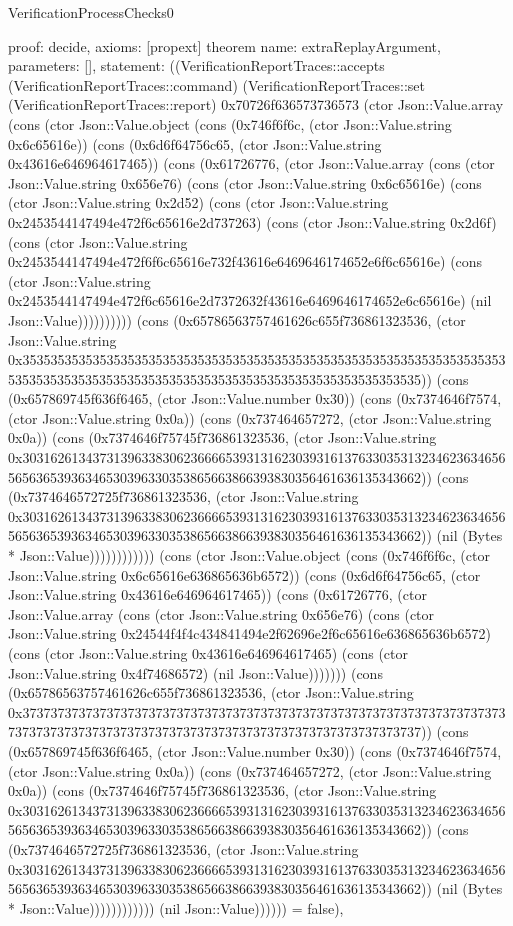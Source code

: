 \begin{lexlean}{VerificationProcessChecks0}
\begin{semanticmodule}
{  proof: decide{},
  axioms: [propext]
}
theorem{
  name: extraReplayArgument,
  parameters: [],
  statement: ((VerificationReportTraces::accepts (VerificationReportTraces::command) (VerificationReportTraces::set (VerificationReportTraces::report) 0x70726f636573736573 (ctor Json::Value.array (cons (ctor Json::Value.object (cons (0x746f6f6c, (ctor Json::Value.string 0x6c65616e)) (cons (0x6d6f64756c65, (ctor Json::Value.string 0x43616e646964617465)) (cons (0x61726776, (ctor Json::Value.array (cons (ctor Json::Value.string 0x656e76) (cons (ctor Json::Value.string 0x6c65616e) (cons (ctor Json::Value.string 0x2d52) (cons (ctor Json::Value.string 0x2453544147494e472f6c65616e2d737263) (cons (ctor Json::Value.string 0x2d6f) (cons (ctor Json::Value.string 0x2453544147494e472f6f6c65616e732f43616e6469646174652e6f6c65616e) (cons (ctor Json::Value.string 0x2453544147494e472f6c65616e2d7372632f43616e6469646174652e6c65616e) (nil Json::Value)))))))))) (cons (0x65786563757461626c655f736861323536, (ctor Json::Value.string 0x35353535353535353535353535353535353535353535353535353535353535353535353535353535353535353535353535353535353535353535353535353535)) (cons (0x657869745f636f6465, (ctor Json::Value.number 0x30)) (cons (0x7374646f7574, (ctor Json::Value.string 0x0a)) (cons (0x737464657272, (ctor Json::Value.string 0x0a)) (cons (0x7374646f75745f736861323536, (ctor Json::Value.string 0x30316261343731396338306236666539313162303931613763303531323462363465656563653936346530396330353865663866393830356461636135343662)) (cons (0x7374646572725f736861323536, (ctor Json::Value.string 0x30316261343731396338306236666539313162303931613763303531323462363465656563653936346530396330353865663866393830356461636135343662)) (nil (Bytes * Json::Value)))))))))))) (cons (ctor Json::Value.object (cons (0x746f6f6c, (ctor Json::Value.string 0x6c65616e636865636b6572)) (cons (0x6d6f64756c65, (ctor Json::Value.string 0x43616e646964617465)) (cons (0x61726776, (ctor Json::Value.array (cons (ctor Json::Value.string 0x656e76) (cons (ctor Json::Value.string 0x24544f4f4c434841494e2f62696e2f6c65616e636865636b6572) (cons (ctor Json::Value.string 0x43616e646964617465) (cons (ctor Json::Value.string 0x4f74686572) (nil Json::Value))))))) (cons (0x65786563757461626c655f736861323536, (ctor Json::Value.string 0x37373737373737373737373737373737373737373737373737373737373737373737373737373737373737373737373737373737373737373737373737373737)) (cons (0x657869745f636f6465, (ctor Json::Value.number 0x30)) (cons (0x7374646f7574, (ctor Json::Value.string 0x0a)) (cons (0x737464657272, (ctor Json::Value.string 0x0a)) (cons (0x7374646f75745f736861323536, (ctor Json::Value.string 0x30316261343731396338306236666539313162303931613763303531323462363465656563653936346530396330353865663866393830356461636135343662)) (cons (0x7374646572725f736861323536, (ctor Json::Value.string 0x30316261343731396338306236666539313162303931613763303531323462363465656563653936346530396330353865663866393830356461636135343662)) (nil (Bytes * Json::Value)))))))))))) (nil Json::Value)))))) = false),
}
\end{semanticmodule}
\end{lexlean}

